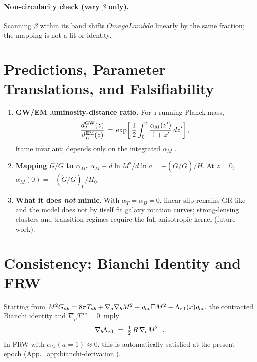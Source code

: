 \documentclass[aps,prd,onecolumn,superscriptaddress,nofootinbib]{revtex4-2}
\def\OmL{OmegaLambda}%
\def\boxed#1{#1}%
\newcommand{\OmL}{\Omega_\Lambda}
\begin{document}
\paragraph*{Non-circularity check (vary \(\beta\) only).}
Scanning \(\beta\) within its band shifts \(\OmL\) linearly by the same fraction; the mapping is not a fit or identity.

\section{Predictions, Parameter Translations, and Falsifiability}
\label{sec:predictions}
\begin{enumerate}[leftmargin=1.3em]
\item \textbf{GW/EM luminosity-distance ratio.} For a running Planck mass,
\begin{equation}
\frac{d_L^{\rm GW}(z)}{d_L^{\rm EM}(z)} \,=\, \exp\!\left[\, \frac{1}{2}\int_{0}^{z} \frac{\alpha_M(z')}{1+z'}\,dz' \right],
\end{equation}
frame invariant; depends only on the integrated \(\alpha_M\) \cite{LombriserTaylor2016}.
\item \textbf{Mapping \(\dot G/G\) to \(\alpha_M\).}
\(\alpha_M \equiv d\ln M^2/d\ln a = -(\dot G/G)/H\). At \(z=0\), \(\alpha_M(0)=-(\dot G/G)_0/H_0\).
\item \textbf{What it does \emph{not} mimic.} With \(\alpha_T=\alpha_B=0\), linear slip remains GR-like and the model does not by itself fit galaxy rotation curves; strong-lensing clusters and transition regimes require the full anisotropic kernel (future work).
\end{enumerate}

\section{Consistency: Bianchi Identity and FRW}
\label{sec:bianchi}
Starting from
\(
M^2 G_{ab}=8\pi T_{ab}+\nabla_a\nabla_b M^2-g_{ab}\Box M^2-\Lambda_{\rm eff}(x) g_{ab},
\)
the contracted Bianchi identity and \(\nabla_\mu T^{\mu\nu}=0\) imply
\begin{equation}
\boxed{\ \nabla_b \Lambda_{\rm eff} \;=\; \tfrac{1}{2}\,R\,\nabla_b M^2\ }\ .
\label{eq:bianchi-consistency}
\end{equation}
In FRW with \(\alpha_M(a{=}1)\approx 0\), this is automatically satisfied at the present epoch (App.~\ref{app:bianchi-derivation}).
\end{document}
